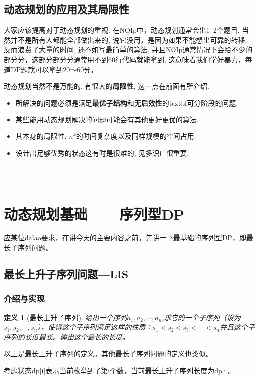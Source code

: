 \documentclass{article}
\newtheorem{definition}{定义}[subsection]
\theoremstyle{nonumberplain}
\begin{document}
\subsection{动态规划的应用及其局限性}
大家应该提高对于动态规划的重视.
在NOIp中，动态规划通常会出1~2个题目, 当然并不是所有人都能全部做出来的, 说它没用，是因为如果不能想出可靠的转移, 反而浪费了大量的时间, 还不如写最简单的算法, 并且NOIp通常情况下会给不少的部分分，这部分部分分通常用不到60行代码就能拿到, 这意味着我们学好暴力，每道DP题就可以拿到20～60分。

动态规划当然不是万能的, 有很大的\textbf{局限性}, 这一点在前面有所介绍.
\begin{itemize}
	\item{所解决的问题必须是满足\textbf{最优子结构}和\textbf{无后效性}的textbf{可分阶段}的问题.}
	\item{某些能用动态规划解决的问题可能会有其他更好更优的算法.}
	\item{其本身的局限性, $n^k$的时间复杂度以及同样规模的空间占用.}
	\item{设计出足够优秀的状态这有时是很难的, 见多识广很重要.}
\end{itemize}
\textcolor{white}{希望大家不要放弃，OIer这个群体很是特殊，并且饱受排挤，大家一定坚持下去，不管外界怎么看待我们，一定要记住自己的目标。不忘初心，方得始终。}

\section{动态规划基础------序列型DP}
应某位dalao要求，在讲今天的主要内容之前，先讲一下最基础的序列型DP，即最长子序列问题。
\subsection{最长上升子序列问题---LIS}
\subsubsection{介绍与实现}
\begin{definition}[最长上升子序列]
	给出一个序列$a_1, a_2, \cdots, a_n$,求它的一个子序列（设为$s_1, s_2, \cdots, s_n$），使得这个子序列满足这样的性质：$s_1<s_2<s_3<\cdots<s_n$并且这个子序列的长度最长。输出这个最长的长度。
\end{definition}

以上是最长上升子序列的定义。其他最长子序列问题的定义也类似。



考虑状态dp[i]表示当前枚举到了第i个数，当前最长上升子序列长度为dp[i]。
\end{document}
